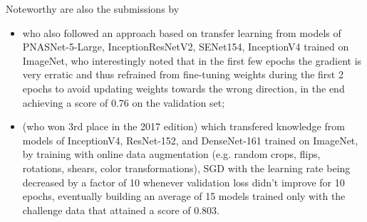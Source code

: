 Noteworthy are also the submissions by

\begin{itemize}
    \item \citeauthor{isic2018milton} \cite{isic2018milton} who also followed an approach based on transfer learning from models of PNASNet-5-Large, InceptionResNetV2, SENet154, InceptionV4 trained on ImageNet, who interestingly noted that in the first few epochs the gradient is very erratic and thus refrained from fine-tuning weights during the first 2 epochs to avoid updating weights towards the wrong direction, in the end achieving a score of 0.76 on the validation set;
    \item \citeauthor{isic2018bissoto} \cite{isic2018bissoto} (who won 3rd place in the 2017 edition) which transfered knowledge from models of InceptionV4, ResNet-152, and DenseNet-161 trained on ImageNet, by training with online data augmentation (e.g. random crops, flips, rotations, shears, color transformations), \ac{SGD} with the learning rate being decreased by a factor of 10 whenever validation loss didn't improve for 10 epochs, eventually building an average of 15 models trained only with the challenge data that attained a score of 0.803.
\end{itemize}
